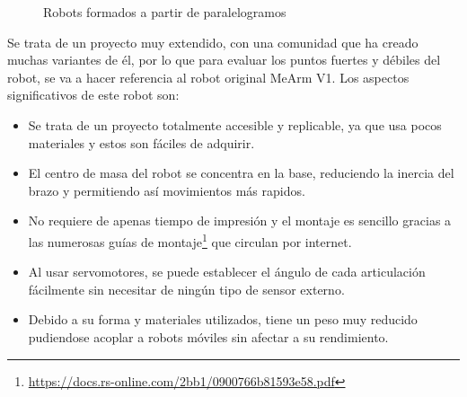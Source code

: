 \begin{itemize}
    \begin{figure} [h!]
        \centering    
        \hspace{3cm}
        \caption{Robots formados a partir de paralelogramos}
    \end{figure}
    \newpage
    Se trata de un proyecto muy extendido, con una comunidad que ha creado muchas variantes de él, por lo que para evaluar los puntos fuertes y 
    débiles del robot, se va a hacer referencia al robot original MeArm V1.
    Los aspectos significativos de este robot son:
    \begin{itemize}
        \item Se trata de un proyecto totalmente accesible y replicable, ya que usa pocos materiales y estos son fáciles de adquirir.
        \item El centro de masa del robot se concentra en la base, reduciendo la inercia del brazo y permitiendo así movimientos más rapidos.
        \item No requiere de apenas tiempo de impresión y el montaje es sencillo gracias a las numerosas guías de 
        montaje\footnote{\url{https://docs.rs-online.com/2bb1/0900766b81593e58.pdf}} que circulan por internet.
        \item Al usar servomotores, se puede establecer el ángulo de cada articulación fácilmente sin necesitar de ningún tipo de sensor externo.
        \item Debido a su forma y materiales utilizados, tiene un peso muy reducido pudiendose acoplar a robots móviles sin afectar a 
        su rendimiento.
    \end{itemize}

\end{itemize}
